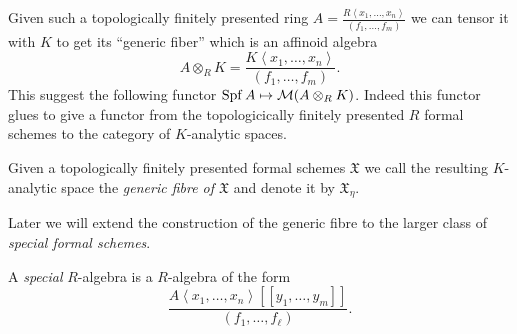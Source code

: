 Given such a topologically finitely presented ring $A = \frac{R \left<x_1, \ldots, x_n \right>}{(f_1, \ldots, f_m)}$ we can tensor it with $K$ to get its ``generic fiber'' which is an affinoid algebra \[
A \otimes _R K = \frac{K \left<x_1, \ldots, x_n \right>}{(f_1, \ldots, f_m)}
.\]  
This suggest the following functor $\operatorname{Spf} A \mapsto \mathcal{M} (A \otimes_R K)$. 
Indeed this functor glues to give a functor from the topologicically finitely presented $R$ formal schemes to the category of $K$-analytic spaces. 

\begin{definition}\label{def:generic_fibre_of_formal_scheme}
Given a topologically finitely presented formal schemes $\mathfrak{X} $ we call the resulting $K$-analytic space the \emph{generic fibre of  $\mathfrak{X} $} and denote it by $\mathfrak{X} _\eta$. 
\end{definition}

Later we will extend the construction of the generic fibre to the larger class of \emph{special formal schemes}.
\begin{definition}\label{def:special_r_algebra}
	A \emph{special} $R$-algebra is a $R$-algebra of the form \[
		\frac{A\left<x_1, \ldots, x_n \right>[[y_1, \ldots, y_m]]}{(f_1, \ldots, f_\ell)}
	.\] 
\end{definition}




